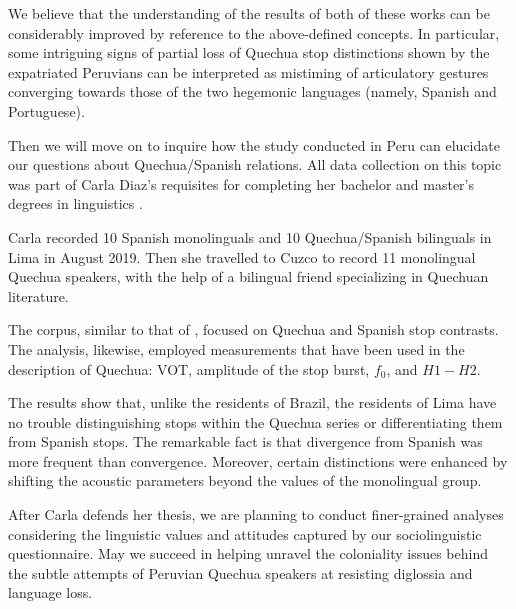 We believe that the understanding of the results of both of these works can be
considerably improved by reference to the above-defined concepts. In
particular, some intriguing signs of partial loss of Quechua stop distinctions
shown by the expatriated Peruvians can be interpreted as mistiming of
articulatory gestures converging towards those of the two hegemonic languages
(namely, Spanish and Portuguese).

Then we will move on to inquire how the study conducted in Peru can elucidate
our questions about Quechua/Spanish relations. All data collection on this
topic was part of Carla Diaz's requisites for completing her bachelor and
master’s degrees in linguistics \citep{diaz2018,diaz2021}. 

Carla recorded 10 Spanish monolinguals and 10 Quechua/Spanish bilinguals in
Lima in August 2019. Then she travelled to Cuzco to record 11 monolingual
Quechua speakers, with the help of a bilingual friend specializing in Quechuan
literature.

The corpus, similar to that of \citet{albano2020}, focused on Quechua and
Spanish stop contrasts. The analysis, likewise, employed measurements that have
been used in the description of Quechua: VOT, amplitude of the stop burst, $f_0$,
and $H1-H2$.

The results show that, unlike the residents of Brazil, the residents of Lima
have no trouble distinguishing stops within the Quechua series or
differentiating them from Spanish stops. The remarkable fact is that divergence
from Spanish was more frequent than convergence. Moreover, certain distinctions
were enhanced by shifting the acoustic parameters beyond the values of the
monolingual group.

After Carla defends her thesis, we are planning to conduct finer-grained
analyses considering the linguistic values and attitudes captured by our
sociolinguistic questionnaire. May we succeed in helping unravel the
coloniality issues behind the subtle attempts of Peruvian Quechua speakers at
resisting diglossia and language loss.




